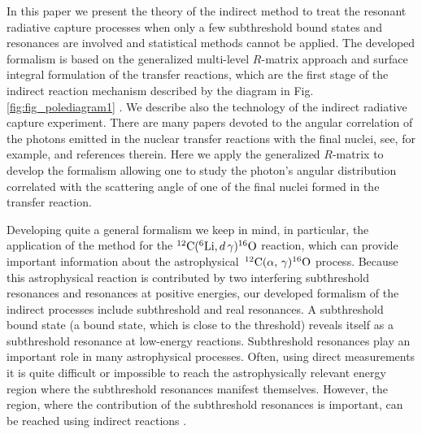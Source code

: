\documentclass[prl,unsortedaddress,groupedaddress,twocolumn,amsmath,amsfonts,amssymb,showpacs,floatfix,nofootinbib]{revtex4}
\begin{document}
In this paper we present the theory of the indirect method to treat the resonant radiative capture processes when only a few subthreshold bound states and resonances are involved
and statistical methods cannot be applied. The developed formalism is based on the generalized multi-level  $R$-matrix approach and surface integral formulation of the transfer reactions, which are the first stage of the indirect reaction mechanism described by  the diagram in Fig. 
\ref{fig:fig_polediagram1} \cite{reviewpaper}. We describe also the technology of the indirect radiative capture experiment.
There are many papers devoted to the angular correlation of the photons emitted in the nuclear transfer reactions
with the final nuclei, see, for example, \cite{Austern} and references therein. Here we apply the generalized $R$-matrix to develop the formalism allowing one to study the photon's angular distribution correlated with the scattering angle of one of the final nuclei formed in the transfer reaction.

Developing quite a general formalism we keep in mind, in particular, the application of the method for the ${}^{12}{\rm C}({}^{6}{\rm Li},d\,\gamma){}^{16}{\rm O}$ reaction, which can provide important information about the astrophysical 
$\,{}^{12}{\rm C}(\alpha,\,\gamma){}^{16}{\rm O}$ process. Because this astrophysical reaction is contributed by two interfering subthreshold resonances and resonances at positive energies, our developed formalism of the indirect processes include subthreshold and real resonances.
A subthreshold bound state (a bound state, which  is close to the threshold) reveals itself as a subthreshold resonance at low-energy  reactions. Subthreshold resonances play an important role in many astrophysical processes. Often, using direct measurements  it is quite difficult or impossible to reach the astrophysically relevant energy region where the subthreshold resonances manifest themselves. However,  the region, where the contribution of the subthreshold resonances is important, can be reached using indirect reactions  \cite{reviewpaper}.
\end{document}
